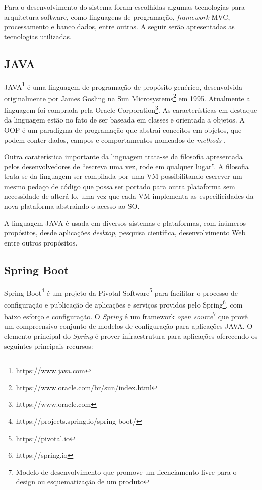 Para o desenvolvimento do sistema foram escolhidas algumas tecnologias para arquitetura software, como linguagens de programação, \textit{framework} \ac{MVC}, processamento e banco dados, entre outras. A seguir serão apresentadas as tecnologias utilizadas.

\subsection{JAVA}

JAVA\footnote{https://www.java.com} é uma linguagem de programação de propósito genérico, desenvolvida originalmente por James Gosling na Sun Microsystems\footnote{ https://www.oracle.com/br/sun/index.html} em 1995. Atualmente a linguagem foi comprada pela Oracle Corporation\footnote{https://www.oracle.com}. As características em destaque da linguagem estão no fato de ser baseada em classes e orientada a objetos. A \ac{OOP} é um paradigma de programação que abstrai conceitos em objetos, que podem conter dados, campos e comportamentos nomeados de \textit{methods} \citep{Lewis2000}. 

Outra caraterística importante da linguagem trata-se da filosofia apresentada pelos desenvolvedores de “escreva uma vez, rode em qualquer lugar”. A filosofia trata-se da linguagem ser compilada por uma \ac{VM} possibilitando escrever um mesmo pedaço de código que possa ser portado para outra plataforma sem necessidade de alterá-lo, uma vez que cada \ac{VM} implementa as especificidades da nova plataforma abstraindo o acesso ao \ac{SO}.

A linguagem JAVA é usada em diversos sistemas e plataformas, com inúmeros propósitos, desde aplicações \textit{desktop}, pesquisa científica, desenvolvimento Web entre outros propósitos.

\subsection{Spring Boot}

Spring Boot\footnote{https://projects.spring.io/spring-boot/} é um projeto da 	Pivotal Software\footnote{https://pivotal.io} para facilitar o processo de configuração e publicação de aplicações e serviços providos pelo Spring\footnote{https://spring.io}, com baixo esforço e configuração. O \textit{Spring} é um framework \textit{open source}\footnote{Modelo de desenvolvimento que promove um licenciamento livre para o design ou esquematização  de um produto} que provê um compreensivo conjunto de modelos de configuração para aplicações JAVA. O elemento principal do \textit{Spring} é prover infraestrutura para aplicações oferecendo os seguintes principais recursos:

